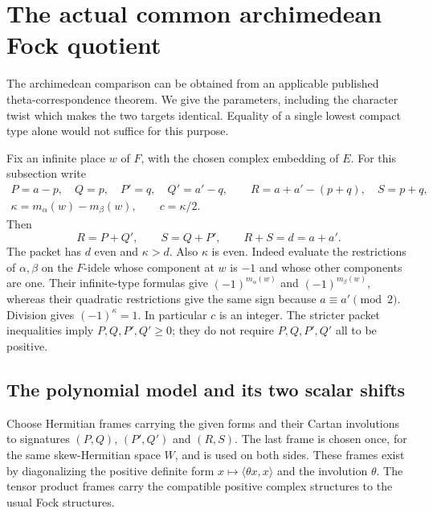 \section{The actual common archimedean Fock quotient}
\label{sec:sr-real-matching-construction}

The archimedean comparison can be obtained from an applicable
published theta-correspondence theorem. We give the parameters,
including the character twist which makes the two targets
identical. Equality of a single lowest compact type alone
would not suffice for this purpose.

Fix an infinite place \(w\) of \(F\), with the chosen complex
embedding of \(E\). For this subsection write
\[
 \begin{gathered}
 P=a-p,\quad Q=p,\quad P'=q,\quad Q'=a'-q,\qquad
 R=a+a'-(p+q),\quad S=p+q,\\
 \kappa=m_\alpha(w)-m_\beta(w),\qquad c=\kappa/2.
 \end{gathered}
\]
Then
\begin{equation}\label{eq:sr-real-complementary-signatures}
              R=P+Q',\qquad S=Q+P',\qquad R+S=d=a+a'.
\end{equation}
The packet has \(d\) even and \(\kappa>d\).
Also \(\kappa\) is even. Indeed evaluate the restrictions of
\(\alpha,\beta\) on the \(F\)-idele whose component at \(w\)
is \(-1\) and whose other components are one.
Their infinite-type formulas give \((-1)^{m_\alpha(w)}\)
and \((-1)^{m_\beta(w)}\), whereas their quadratic restrictions
give the same sign because \(a\equiv a'\pmod2\).
Division gives \((-1)^\kappa=1\).
In particular \(c\) is an integer.
The stricter packet inequalities imply \(P,Q,P',Q'\ge0\);
they do not require \(P,Q,P',Q'\) all to be positive.

\subsection{The polynomial model and its two scalar shifts}
Choose Hermitian frames carrying the given forms and their
Cartan involutions to signatures \((P,Q)\), \((P',Q')\)
and \((R,S)\). The last frame is chosen once, for the same
skew-Hermitian space \(W\), and is used on both sides.
These frames exist by diagonalizing the positive definite
form \(x\mapsto\langle\theta x,x\rangle\) and the involution
\(\theta\). The tensor product frames carry the compatible
positive complex structures to the usual Fock structures.

